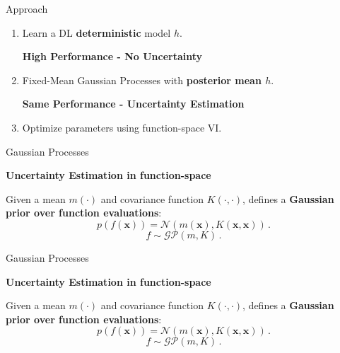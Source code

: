 \documentclass[aspectratio=149]{beamer}
\newcommand{\h}[1]{\color{orange}\textbf{#1}}
\begin{document}
    \begin{frame}{Approach}

        \begin{enumerate}[<+->]
            \item Learn a DL \textbf{deterministic} model \(h\).
            \begin{center}
                \h{High Performance - No Uncertainty}
            \end{center}
            \item  Fixed-Mean Gaussian Processes with \textbf{posterior mean \(h\)}.
            \begin{center}
                \h{Same Performance - Uncertainty Estimation}
            \end{center}
            \item Optimize parameters using function-space VI.
        \end{enumerate}

    \end{frame}
        \begin{frame}{Gaussian Processes}
        \begin{center}\color{orange}
            \textbf{Uncertainty Estimation in function-space}
        \end{center}
        {\color{shadecolor}
        Given a mean \(m(\cdot)\) and covariance function \(K(\cdot, \cdot)\), defines a \textbf{Gaussian prior over function evaluations}:
        \[
        p(f(\mathbf{x})) = \mathcal{N}(m(\mathbf{x}), K(\mathbf{x}, \mathbf{x}))\,.
        \]
        \[
        f \sim \mathcal{G}\mathcal{P}(m, K)\,.
        \]
        }
    \end{frame}
    \begin{frame}{Gaussian Processes}
        \begin{center}\color{shadecolor}\textbf{Uncertainty Estimation in function-space}
        \end{center}
        {\color{black}
        Given a mean \(m(\cdot)\) and covariance function \(K(\cdot, \cdot)\), defines a {\color{orange}\textbf{Gaussian prior over function evaluations}}:
        \[
        p(f(\mathbf{x})) = \mathcal{N}(m(\mathbf{x}), K(\mathbf{x}, \mathbf{x}))\,.
        \]
        \[
        f \sim \mathcal{G}\mathcal{P}(m, K)\,.
        \]
        }
    \end{frame}
\end{document}

